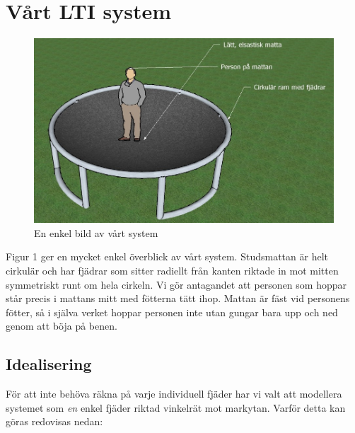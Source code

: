 \documentclass[10pt,a4paper]{article}
\begin{document}
\newpage
\section{Vårt LTI system}

\begin{figure}[ht]
\begin{center}
\includegraphics[scale=0.62]{Bild2}
\caption{En enkel bild av vårt system}
\end{center}
\end{figure}

Figur 1 ger en mycket enkel överblick av vårt system. Studsmattan är helt cirkulär och har fjädrar som sitter radiellt från kanten riktade in mot mitten symmetriskt runt om hela cirkeln. Vi gör antagandet att personen som hoppar står precis i mattans mitt med fötterna tätt ihop. Mattan är fäst vid personens fötter, så i själva verket hoppar personen inte utan gungar bara upp och ned genom att böja på benen.

\subsection{Idealisering}
För att inte behöva räkna på varje individuell fjäder har vi valt att modellera systemet som \textit{en} enkel fjäder riktad vinkelrät mot markytan. Varför detta kan göras redovisas nedan:
\end{document}
